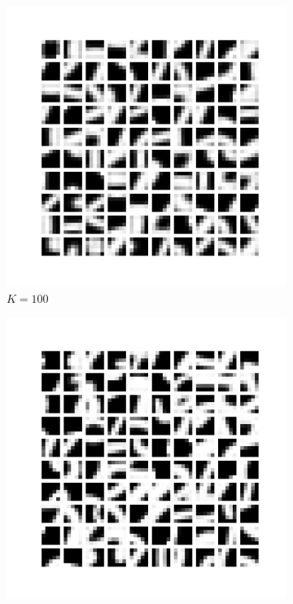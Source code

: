\documentclass{article}
\begin{document}
\begin{figure}[htbp!]
    \centering
    \begin{subfigure}[b]{0.48\textwidth}
        \centering
        \includegraphics[width=\textwidth]{../Result/Centroids/100-clusters-centroids.png}
        \caption{$K = 100$}
        \label{fig:100-centroids}
    \end{subfigure}
    \hfill
    \begin{subfigure}[b]{0.48\textwidth}
        \centering
        \includegraphics[width=\textwidth]{../Result/Centroids/10000-clusters-centroids.png}

\end{subfigure}
\end{figure}
\end{document}
